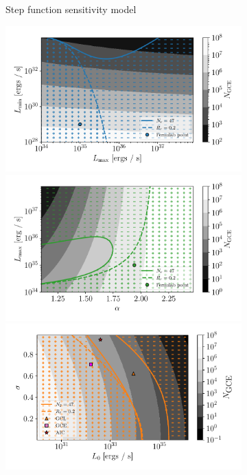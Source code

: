 \documentclass[a4paper,11pt]{article}
\begin{document}
\begin{figure}
\begin{subfigure}[b]{0.49\textwidth}
        \caption{Step function sensitivity model}
        \label{fig:step-function}
    \end{subfigure}
    \hfill
    \begin{subfigure}[b]{0.49\textwidth}
        \includegraphics[width=\textwidth]{figs/power-law-pos-1x.pdf}
        \includegraphics[width=\textwidth]{figs/power-law-alpha-pos-1x.pdf}
        \includegraphics[width=\textwidth]{figs/log-normal-pos-1x.pdf}

\end{subfigure}
\end{figure}
\end{document}
